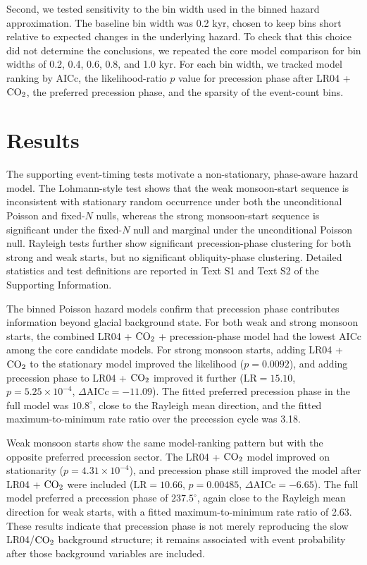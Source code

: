 \documentclass[11pt]{article}
\begin{document}
Second, we tested sensitivity to the bin width used in the binned hazard approximation. The baseline bin width was 0.2 kyr, chosen to keep bins short relative to expected changes in the underlying hazard. To check that this choice did not determine the conclusions, we repeated the core model comparison for bin widths of 0.2, 0.4, 0.6, 0.8, and 1.0 kyr. For each bin width, we tracked model ranking by AICc, the likelihood-ratio \(p\) value for precession phase after LR04 + \(\ce{CO2}\), the preferred precession phase, and the sparsity of the event-count bins.

\section*{Results}

The supporting event-timing tests motivate a non-stationary, phase-aware hazard model. The Lohmann-style test shows that the weak monsoon-start sequence is inconsistent with stationary random occurrence under both the unconditional Poisson and fixed-\(N\) nulls, whereas the strong monsoon-start sequence is significant under the fixed-\(N\) null and marginal under the unconditional Poisson null. Rayleigh tests further show significant precession-phase clustering for both strong and weak starts, but no significant obliquity-phase clustering. Detailed statistics and test definitions are reported in Text S1 and Text S2 of the Supporting Information.

The binned Poisson hazard models confirm that precession phase contributes information beyond glacial background state. For both weak and strong monsoon starts, the combined LR04 + \(\ce{CO2}\) + precession-phase model had the lowest AICc among the core candidate models. For strong monsoon starts, adding LR04 + \(\ce{CO2}\) to the stationary model improved the likelihood (\(p=0.0092\)), and adding precession phase to LR04 + \(\ce{CO2}\) improved it further (\(\mathrm{LR}=15.10\), \(p=5.25\times10^{-4}\), \(\Delta\mathrm{AICc}=-11.09\)). The fitted preferred precession phase in the full model was \(10.8^\circ\), close to the Rayleigh mean direction, and the fitted maximum-to-minimum rate ratio over the precession cycle was 3.18.

Weak monsoon starts show the same model-ranking pattern but with the opposite preferred precession sector. The LR04 + \(\ce{CO2}\) model improved on stationarity (\(p=4.31\times10^{-4}\)), and precession phase still improved the model after LR04 + \(\ce{CO2}\) were included (\(\mathrm{LR}=10.66\), \(p=0.00485\), \(\Delta\mathrm{AICc}=-6.65\)). The full model preferred a precession phase of \(237.5^\circ\), again close to the Rayleigh mean direction for weak starts, with a fitted maximum-to-minimum rate ratio of 2.63. These results indicate that precession phase is not merely reproducing the slow LR04/\(\ce{CO2}\) background structure; it remains associated with event probability after those background variables are included.
\end{document}
